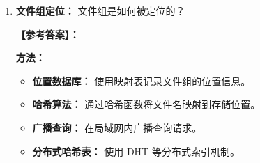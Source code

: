 \documentclass[a4paper,12pt]{article}
\newcommand{\answer}[1]{\par\vspace{0.5em}\hspace{2em}\textbf{【参考答案】：}\\{\color{blue}#1}\par\vspace{1em}}
\begin{document}
\begin{enumerate}[label=\arabic*.]
{    \textbf{模块划分：}
    \begin{itemize}
        \item 目录服务模块。
        \item 文件服务模块。
        \item 块服务/扁平文件模块。
        \item 客户接口模块。
    \end{itemize}
    }

    \item \textbf{文件组定位：}
    文件组是如何被定位的？
    
    \answer{
    \textbf{方法：}
    \begin{itemize}
        \item \textbf{位置数据库：} 使用映射表记录文件组的位置信息。
        \item \textbf{哈希算法：} 通过哈希函数将文件名映射到存储位置。
        \item \textbf{广播查询：} 在局域网内广播查询请求。
        \item \textbf{分布式哈希表：} 使用 DHT 等分布式索引机制。
    \end{itemize}
    }
\end{enumerate}
\end{document}
